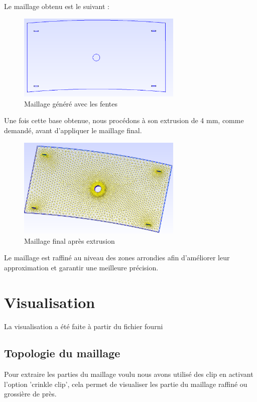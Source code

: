 \documentclass{article}
\begin{document}
Le maillage obtenu est le suivant :

\begin{figure}[H]
    \centering
    \includegraphics[width=0.7\textwidth]{images/gmsh_2.png}
    \caption{Maillage généré avec les fentes}
\end{figure}

Une fois cette base obtenue, nous procédons à son extrusion de 4 mm, comme demandé, avant d'appliquer le maillage final.

\begin{figure}[H]
    \centering
    \includegraphics[width=0.7\textwidth]{images/gmsh_3.png}
    \caption{Maillage final après extrusion}
\end{figure}

Le maillage est raffiné au niveau des zones arrondies afin d'améliorer leur approximation et garantir une meilleure précision.

\section{Visualisation}

La visualisation a été faite à partir du fichier fourni 

\subsection{Topologie du maillage}

Pour extraire les parties du maillage voulu nous avons utilisé des clip en activant l'option 'crinkle clip', 
cela permet de visualiser les partie du maillage raffiné ou grossière de près.
\end{document}
